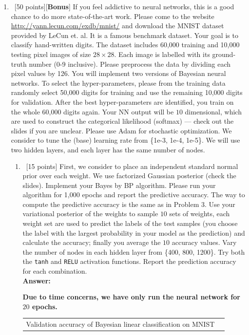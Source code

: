 \documentclass[12pt, fullpage,letterpaper]{article}
\def\red{\color{black!30!red}}
\def\blackblue{\color{black!40!blue}}
\begin{document}
\begin{enumerate}
	\item~[50 points][\textbf{Bonus}] If you feel addictive to neural networks, this is a good chance to do more state-of-the-art work.
	Please come to the website \url{http://yann.lecun.com/exdb/mnist/} and download the MNIST dataset provided by LeCun et. al. It is a famous benchmark dataset. Your goal is to classify hand-written digits. The dataset includes 60,000 training and 10,000 testing pixel images of size $28 \times 28$. Each image is labelled with its ground-truth number (0-9 inclusive). Please preprocess the data by dividing each pixel values by 126. You will implement two versions of Bayesian neural networks. To select the hyper-parameters, please from the training data randomly select 50,000 digits for training and use the remaining 10,000 digits for validation. After the best hyper-parameters are identified, you train on the whole 60,000 digits again. Your NN output will be $10$ dimensional, which are used to construct the categorical likelihood (\ie softmax) --- check out the slides if you are unclear. Please use Adam for stochastic optimization. We consider to tune the (base) learning rate from \{1e-3, 1e-4, 1e-5\}. 
	We will use two hidden layers, and each layer has the same number of nodes. 
	\begin{enumerate}
		\item~[15 points] First, we consider to place an independent standard normal prior over each weight. We use factorized Gaussian posterior (check the slides).  Implement your Bayes by BP algorithm. Please run your algorithm for 1,000 epochs and report the predictive accuracy. The way to compute the predictive accuracy is the same as in Problem 3. Use your variational posterior of the weights to sample $10$ sets of weights, each weight set are used to predict the labels of the test samples (you choose the label with the largest probability in your model as the prediction) and calculate the accuracy; finally you average the $10$ accuracy values. Vary the number of nodes in each hidden layer from \{400, 800, 1200\}. Try both the \texttt{tanh} and \texttt{RELU} activation functions. Report the prediction accuracy for each combination.  \\
{\bf \red Answer: }{\blackblue 
{\bf\red Due to time concerns, we have only run the neural network for $20$ epochs. }		
		\begin{center}
\begin{tabular}{ |c||c|c|c|c|}
 \hline
 \multicolumn{4}{|c|}{Validation accuracy of Bayesian linear classification on MNIST} \\

\end{tabular}
\end{center}}
\end{enumerate}
\end{enumerate}
\end{document}
